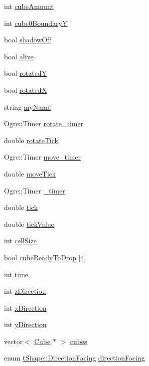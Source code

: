 \begin{DoxyCompactItemize}
\item 
int \hyperlink{classt_shape_a39a906a952b50e774dd199829763ce1f}{cube\-Amount}
\item 
int \hyperlink{classt_shape_ab536ba2d1c2fc3e4f367ecf936e49f14}{cube0\-Boundary\-Y}
\item 
bool \hyperlink{classt_shape_a7c8f00d63a58a51843de002a9652cac7}{shadow\-Off}
\item 
bool \hyperlink{classt_shape_a1bb379051554beb845b42fb441e0939c}{alive}
\item 
bool \hyperlink{classt_shape_a2bafbe715483f3f4da44eafae17aac5f}{rotated\-Y}
\item 
bool \hyperlink{classt_shape_a502388884d8386251696471623158a76}{rotated\-X}
\item 
string \hyperlink{classt_shape_ab461221e1ac0abdef5007a6516303d8e}{my\-Name}
\item 
Ogre\-::\-Timer \hyperlink{classt_shape_ae50ef7ba28f10ebe97ab2c431fa27c08}{rotate\-\_\-timer}
\item 
double \hyperlink{classt_shape_ad7f4f8ddfe299bf838030cbc521acb6f}{rotate\-Tick}
\item 
Ogre\-::\-Timer \hyperlink{classt_shape_a8da32e43eeb8ca2a96682ddfd95de45f}{move\-\_\-timer}
\item 
double \hyperlink{classt_shape_a01c34bd393df7caa86a4ff785a1775bd}{move\-Tick}
\item 
Ogre\-::\-Timer \hyperlink{classt_shape_ade6208b0cd2a248227f8ac43e3c3b494}{\-\_\-timer}
\item 
double \hyperlink{classt_shape_a49dc22290f02a6e6ff0f106ffcb16083}{tick}
\item 
double \hyperlink{classt_shape_ad211ab24428076e438d6c9212cd0daa0}{tick\-Value}
\item 
int \hyperlink{classt_shape_a1692503641320662db249899a96465f4}{cell\-Size}
\item 
bool \hyperlink{classt_shape_a373d44cd6129f88aded56fd7a7ea7e43}{cube\-Ready\-To\-Drop} \mbox{[}4\mbox{]}
\item 
int \hyperlink{classt_shape_a959bedb9443f8d99092fe7e249354068}{time}
\item 
int \hyperlink{classt_shape_a5f192d399b118e50bf47c48f3acbd74c}{z\-Direction}
\item 
int \hyperlink{classt_shape_a7d7596d539b46bd0cf0935a1b49c025f}{x\-Direction}
\item 
int \hyperlink{classt_shape_a5049442ea1c882642d58bc384666a9d7}{y\-Direction}
\item 
vector$<$ \hyperlink{class_cube}{Cube} $\ast$ $>$ \hyperlink{classt_shape_a4007a5ffd638a42923b64d09c5d50a87}{cubes}
\item 
enum \hyperlink{classt_shape_a193bb18f526dc3f027748fc231b577ae}{t\-Shape\-::\-Direction\-Facing} \hyperlink{classt_shape_a989a7205be02a011dae710470973a3c4}{direction\-Facing}
\end{DoxyCompactItemize}


